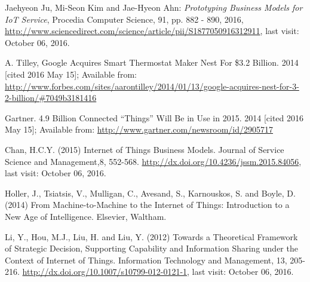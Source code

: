\begin{thebibliography}{99}
	 Jaehyeon Ju, Mi-Seon Kim and Jae-Hyeon Ahn: \emph{Prototyping Business Models for IoT Service}, Procedia Computer Science, 91, pp. 882 - 890, 2016, \url{http://www.sciencedirect.com/science/article/pii/S1877050916312911}, last visit: October 06, 2016.
 	
 	  A. Tilley, Google Acquires Smart Thermostat Maker Nest For \$3.2 Billion. 2014  [cited 2016 May 15]; Available from: \url{http://www.forbes.com/sites/aarontilley/2014/01/13/google-acquires-nest-for-3-2-billion/#7049b3181416}
 	
 	  Gartner. 4.9 Billion Connected ``Things'' Will Be in Use in 2015. 2014  [cited 2016 May 15]; Available from: \url{http://www.gartner.com/newsroom/id/2905717}

	 Chan, H.C.Y. (2015) Internet of Things Business Models. Journal of Service Science and Management,8, 552-568. \url{http://dx.doi.org/10.4236/jssm.2015.84056}, last visit: October 06, 2016.

	 

	 

	 

	 Holler, J., Tsiatsis, V., Mulligan, C., Avesand, S., Karnouskos, S. and Boyle, D. (2014) From Machine-to-Machine to the Internet of Things: Introduction to a New Age of Intelligence. Elsevier, Waltham.

	 Li, Y., Hou, M.J., Liu, H. and Liu, Y. (2012) Towards a Theoretical Framework of Strategic Decision, Supporting Capability and Information Sharing under the Context of Internet of Things. Information Technology and Management, 13, 205-216.
	\url{http://dx.doi.org/10.1007/s10799-012-0121-1}, last visit: October 06, 2016.

	 

 \end{thebibliography}

